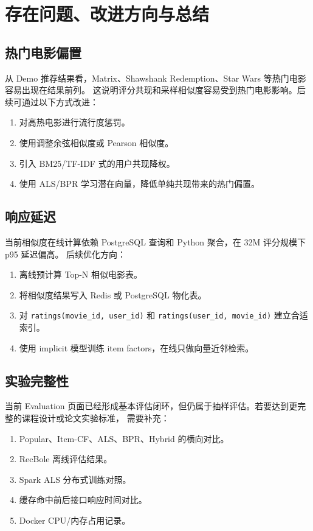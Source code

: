 \section{存在问题、改进方向与总结}

\subsection{热门电影偏置}

从 Demo 推荐结果看，Matrix、Shawshank Redemption、Star Wars 等热门电影容易出现在结果前列。
这说明评分共现和采样相似度容易受到热门电影影响。后续可通过以下方式改进：

\begin{enumerate}[leftmargin=2em]
  \item 对高热电影进行流行度惩罚。
  \item 使用调整余弦相似度或 Pearson 相似度。
  \item 引入 BM25/TF-IDF 式的用户共现降权。
  \item 使用 ALS/BPR 学习潜在向量，降低单纯共现带来的热门偏置。
\end{enumerate}

\subsection{响应延迟}

当前相似度在线计算依赖 PostgreSQL 查询和 Python 聚合，在 32M 评分规模下 p95 延迟偏高。
后续优化方向：

\begin{enumerate}[leftmargin=2em]
  \item 离线预计算 Top-N 相似电影表。
  \item 将相似度结果写入 Redis 或 PostgreSQL 物化表。
  \item 对 \texttt{ratings(movie\_id, user\_id)} 和 \texttt{ratings(user\_id, movie\_id)} 建立合适索引。
  \item 使用 implicit 模型训练 item factors，在线只做向量近邻检索。
\end{enumerate}

\subsection{实验完整性}

当前 Evaluation 页面已经形成基本评估闭环，但仍属于抽样评估。若要达到更完整的课程设计或论文实验标准，
需要补充：

\begin{enumerate}[leftmargin=2em]
  \item Popular、Item-CF、ALS、BPR、Hybrid 的横向对比。
  \item RecBole 离线评估结果。
  \item Spark ALS 分布式训练对照。
  \item 缓存命中前后接口响应时间对比。
  \item Docker CPU/内存占用记录。
\end{enumerate}

